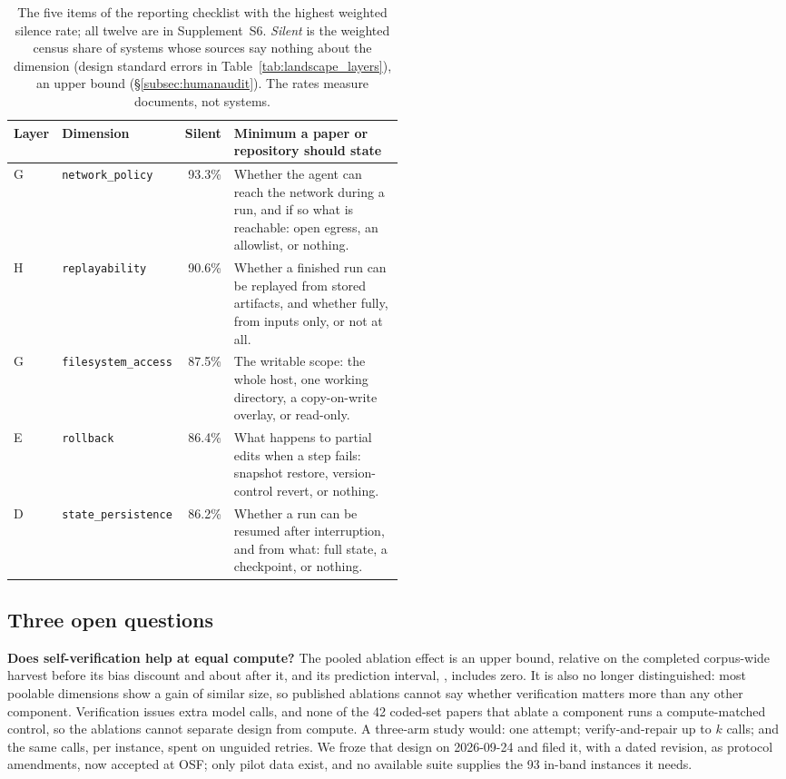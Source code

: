 \begin{table}[t]
\caption{The five items of the reporting checklist with the highest weighted silence rate; all twelve
are in Supplement~S6. \emph{Silent} is the weighted census share of systems whose sources say nothing
about the dimension (design standard errors in Table~\ref{tab:landscape_layers}), an upper bound
(\S\ref{subsec:humanaudit}). The rates measure
documents, not systems.}
\label{tab:checklist}
\footnotesize
\begin{tabular}{llrp{0.50\linewidth}}
\toprule
Layer & Dimension & Silent & Minimum a paper or repository should state \\
\midrule
G & \texttt{network\_policy} & 93.3\% & Whether the agent can reach the network during a run, and if so what is reachable: open egress, an allowlist, or nothing. \\
H & \texttt{replayability} & 90.6\% & Whether a finished run can be replayed from stored artifacts, and whether fully, from inputs only, or not at all. \\
G & \texttt{filesystem\_access} & 87.5\% & The writable scope: the whole host, one working directory, a copy-on-write overlay, or read-only. \\
E & \texttt{rollback} & 86.4\% & What happens to partial edits when a step fails: snapshot restore, version-control revert, or nothing. \\
D & \texttt{state\_persistence} & 86.2\% & Whether a run can be resumed after interruption, and from what: full state, a checkpoint, or nothing. \\
\bottomrule
\end{tabular}
\end{table}

\subsection{Three open questions}
\label{subsec:openq}

\textbf{Does self-verification help at equal compute?} The pooled ablation effect is an upper bound,
\rqSVPooled{} relative on the completed corpus-wide harvest before its bias discount and about
\rqSVDiscounted{} after it, and its prediction interval, \rqSVPI, includes zero. It is also no longer
distinguished: most poolable dimensions show a gain of similar size, so published ablations cannot say
whether verification matters more than any other component. Verification issues extra model calls,
and none of the 42 coded-set papers that ablate a component runs a compute-matched control, so the
ablations cannot separate design from compute. A three-arm
study would: one attempt; verify-and-repair up to $k$ calls; and the same calls, per instance, spent on
unguided retries. We froze that design on 2026-09-24 and filed it, with a dated revision, as protocol
amendments, now accepted at OSF; only pilot data exist, and no available suite supplies the 93
in-band instances it needs.

